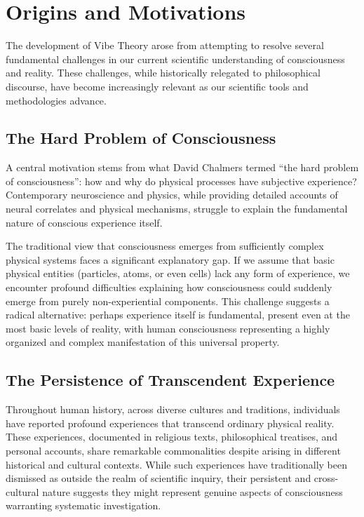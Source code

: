 \documentclass{article}
\theoremstyle{definition}
\theoremstyle{axiom}
\theoremstyle{theorem}
\theoremstyle{proposition}
\begin{document}
\section{Origins and Motivations}

The development of Vibe Theory arose from attempting to resolve several fundamental challenges in our current scientific understanding of consciousness and reality. These challenges, while historically relegated to philosophical discourse, have become increasingly relevant as our scientific tools and methodologies advance.

\subsection{The Hard Problem of Consciousness}

A central motivation stems from what David Chalmers termed \enquote{the hard problem of consciousness}: how and why do physical processes have subjective experience? Contemporary neuroscience and physics, while providing detailed accounts of neural correlates and physical mechanisms, struggle to explain the fundamental nature of conscious experience itself.

The traditional view that consciousness emerges from sufficiently complex physical systems faces a significant explanatory gap. If we assume that basic physical entities (particles, atoms, or even cells) lack any form of experience, we encounter profound difficulties explaining how consciousness could suddenly emerge from purely non-experiential components. This challenge suggests a radical alternative: perhaps experience itself is fundamental, present even at the most basic levels of reality, with human consciousness representing a highly organized and complex manifestation of this universal property.

\subsection{The Persistence of Transcendent Experience}

Throughout human history, across diverse cultures and traditions, individuals have reported profound experiences that transcend ordinary physical reality. These experiences, documented in religious texts, philosophical treatises, and personal accounts, share remarkable commonalities despite arising in different historical and cultural contexts. While such experiences have traditionally been dismissed as outside the realm of scientific inquiry, their persistent and cross-cultural nature suggests they might represent genuine aspects of consciousness warranting systematic investigation.
\end{document}
